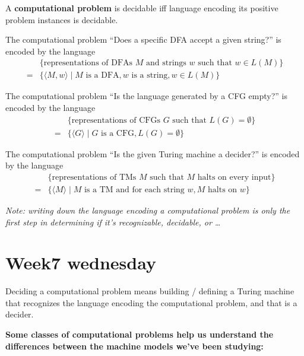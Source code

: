 \documentclass[12pt, oneside]{article}
\begin{document}
A {\bf computational problem} is decidable iff language encoding its positive problem instances
is decidable.

The computational problem ``Does a specific DFA accept a given string?'' is encoded by the language
\begin{align*}
  &\{ \textrm{representations of DFAs $M$ and strings $w$ such that $w \in L(M)$}\}  \\
  =& \{ \langle M, w \rangle \mid M \textrm{ is a DFA}, w \textrm{ is a string}, w \in L(M) \}
\end{align*}

The computational problem ``Is the language generated by a CFG empty?'' is encoded by the language
\begin{align*}
  &\{ \textrm{representations of CFGs $G$  such that $L(G) = \emptyset$}\}  \\
  =& \{ \langle G \rangle \mid G \textrm{ is a CFG},  L(G) = \emptyset \}
\end{align*}



The computational problem ``Is the given Turing machine a decider?'' is encoded by the language
\begin{align*}
  &\{ \textrm{representations of TMs $M$  such that $M$ halts on every input}\}  \\
  =& \{ \langle M \rangle \mid M \textrm{ is a TM and for each string } w, \textrm{$M$ halts on $w$} \}
\end{align*}


{\it Note: writing down the language encoding a computational problem is only the first step in 
determining if it's recognizable, decidable, or \ldots }
 \vfill
\section*{Week7 wednesday}


Deciding a computational problem means building / defining a Turing 
machine that recognizes the language encoding the computational problem, and that 
is a decider.


{\bf Some classes of computational problems help us understand the differences between the machine models we've been studying:}
\end{document}
